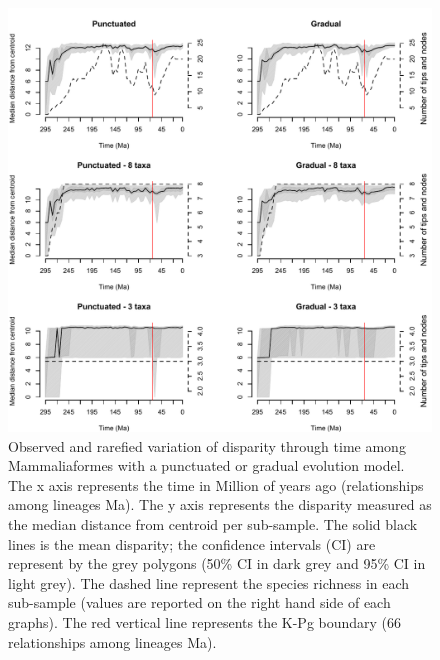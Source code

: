 \begin{figure}
\centering
    \includegraphics[keepaspectratio=true]{Supplementaries/Figures/STD/Slater_full.pdf}
\caption[Mammaliaformes disparity (rarefied)]{Observed and rarefied variation of disparity through time among Mammaliaformes with a punctuated or gradual evolution model. The x axis represents the time in Million of years ago (relationships among lineages
Ma). The y axis represents the disparity measured as the median distance from centroid per sub-sample. The solid black lines is the mean disparity; the confidence intervals (CI) are represent by the grey polygons (50\% CI in dark grey and 95\% CI in light grey). The dashed line represent the species richness in each sub-sample (values are reported on the right hand side of each graphs). The red vertical line represents the K-Pg boundary (66 relationships among lineages
Ma).}
\label{Supp_Mammaliaformes_rarefied}
\end{figure}

